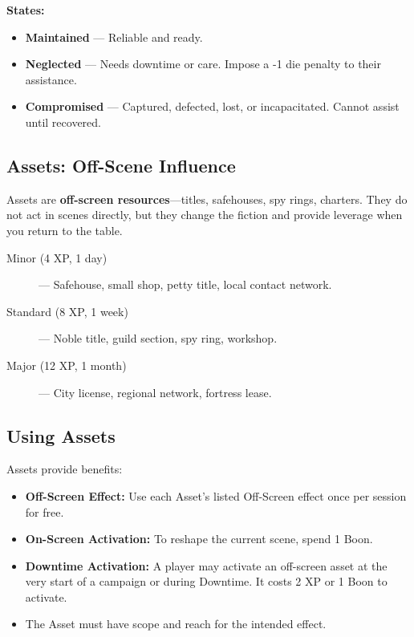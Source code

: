 \textbf{States:}
\begin{itemize}
    \item \textbf{Maintained} --- Reliable and ready.
    \item \textbf{Neglected} --- Needs downtime or care. Impose a -1 die penalty to their assistance.
    \item \textbf{Compromised} --- Captured, defected, lost, or incapacitated. Cannot assist until recovered.
\end{itemize}

\subsection*{Assets: Off-Scene Influence}

Assets are \textbf{off-screen resources}---titles, safehouses, spy rings, charters. They do not act in scenes directly, but they change the fiction and provide leverage when you return to the table.

\begin{description}
    \item[Minor (4 XP, 1 day)] --- Safehouse, small shop, petty title, local contact network.
    \item[Standard (8 XP, 1 week)] --- Noble title, guild section, spy ring, workshop.
    \item[Major (12 XP, 1 month)] --- City license, regional network, fortress lease.
\end{description}

\subsection*{Using Assets}

Assets provide benefits:

\begin{itemize}
    \item \textbf{Off-Screen Effect:} Use each Asset's listed Off-Screen effect once per session for free.
    \item \textbf{On-Screen Activation:} To reshape the current scene, spend 1 Boon.
    \item \textbf{Downtime Activation:} A player may activate an off-screen asset at the very start of a campaign or during Downtime. It costs 2 XP or 1 Boon to activate.
    \item The Asset must have scope and reach for the intended effect.
\end{itemize}

